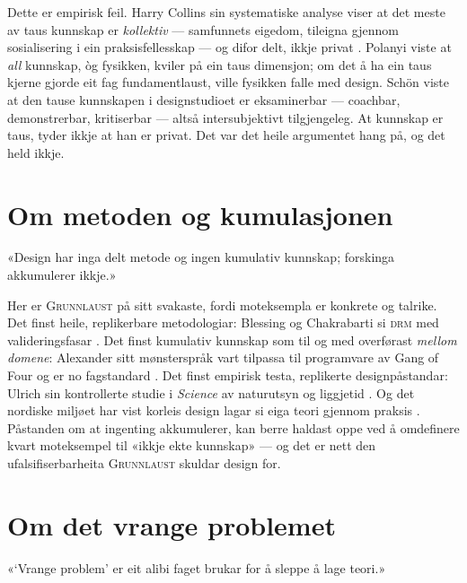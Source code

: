 \noindent Dette er empirisk feil. Harry Collins sin systematiske analyse viser at det meste av taus kunnskap er \emph{kollektiv} — samfunnets eigedom, tileigna gjennom sosialisering i ein praksisfellesskap — og difor delt, ikkje privat \autocite{collins2010tacit}. Polanyi viste at \emph{all} kunnskap, òg fysikken, kviler på ein taus dimensjon; om det å ha ein taus kjerne gjorde eit fag fundamentlaust, ville fysikken falle med design. Schön viste at den tause kunnskapen i designstudioet er eksaminerbar — coachbar, demonstrerbar, kritiserbar — altså intersubjektivt tilgjengeleg. At kunnskap er taus, tyder ikkje at han er privat. Det var det heile argumentet hang på, og det held ikkje.

\section{Om metoden og kumulasjonen}

\begin{innvending}
«Design har inga delt metode og ingen kumulativ kunnskap; forskinga akkumulerer ikkje.»
\end{innvending}

\noindent Her er \textsc{Grunnlaust} på sitt svakaste, fordi moteksempla er konkrete og talrike. Det finst heile, replikerbare metodologiar: Blessing og Chakrabarti si \textsc{drm} med valideringsfasar \autocite{blessing2009drm}. Det finst kumulativ kunnskap som til og med overførast \emph{mellom domene}: Alexander sitt mønsterspråk vart tilpassa til programvare av Gang of Four og er no fagstandard \autocite{gof1994patterns}. Det finst empirisk testa, replikerte designpåstandar: Ulrich sin kontrollerte studie i \textit{Science} av naturutsyn og liggjetid \autocite{ulrich1984view}. Og det nordiske miljøet har vist korleis design lagar si eiga teori gjennom praksis \autocite{redstrom2017making}. Påstanden om at ingenting akkumulerer, kan berre haldast oppe ved å omdefinere kvart moteksempel til «ikkje ekte kunnskap» — og det er nett den ufalsifiserbarheita \textsc{Grunnlaust} skuldar design for.

\section{Om det vrange problemet}

\begin{innvending}
«‘Vrange problem’ er eit alibi faget brukar for å sleppe å lage teori.»
\end{innvending}

